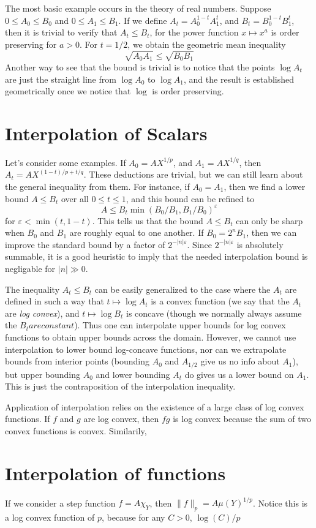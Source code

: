 The most basic example occurs in the theory of real numbers. Suppose $0 \leq A_0 \leq B_0$ and $0 \leq A_1 \leq B_1$. If we define $A_t = A_0^{1-t}A_1^t$, and $B_t = B_0^{1-t}B_1^t$, then it is trivial to verify that $A_t \leq B_t$, for the power function $x \mapsto x^a$ is order preserving for $a > 0$. For $t = 1/2$, we obtain the geometric mean inequality
%
\[ \sqrt{A_0 A_1} \leq \sqrt{B_0 B_1} \]
%
Another way to see that the bound is trivial is to notice that the points $\log A_t$ are just the straight line from $\log A_0$ to $\log A_1$, and the result is established geometrically once we notice that $\log$ is order preserving.

\section{Interpolation of Scalars}

Let's consider some examples. If $A_0 = AX^{1/p}$, and $A_1 = AX^{1/q}$, then $A_t = AX^{(1-t)/p + t/q}$. These deductions are trivial, but we can still learn about the general inequality from them. For instance, if $A_0 = A_1$, then we find a lower bound $A \leq B_t$ over all $0 \leq t \leq 1$, and this bound can be refined to
%
\[ A \leq B_t \min(B_0/B_1,B_1/B_0)^\varepsilon \]
%
for $\varepsilon < \min(t, 1-t)$. This tells us that the bound $A \leq B_t$ can only be sharp when $B_0$ and $B_1$ are roughly equal to one another. If $B_0 = 2^n B_1$, then we can improve the standard bound by a factor of $2^{-|n| \varepsilon}$. Since $2^{-|n| \varepsilon}$ is absolutely summable, it is a good heuristic to imply that the needed interpolation bound is negligable for $|n| \gg 0$.

The inequality $A_t \leq B_t$ can be easily generalized to the case where the $A_t$ are defined in such a way that $t \mapsto \log A_t$ is a convex function (we say that the $A_t$ are {\it log convex}), and $t \mapsto \log B_t$ is concave (though we normally always assume the $B_t are constant$). Thus one can interpolate upper bounds for log convex functions to obtain upper bounds across the domain. However, we cannot use interpolation to lower bound log-concave functions, nor can we extrapolate bounds from interior points (bounding $A_0$ and $A_{1/2}$ give us no info about $A_1$), but upper bounding $A_0$ and lower bounding $A_t$ do gives us a lower bound on $A_1$. This is just the contraposition of the interpolation inequality.

Application of interpolation relies on the existence of a large class of log convex functions. If $f$ and $g$ are log convex, then $fg$ is log convex because the sum of two convex functions is convex. Similarily, 

\section{Interpolation of functions}

If we consider a step function $f = A \chi_Y$, then $\| f \|_p = A \mu(Y)^{1/p}$. Notice this is a log convex function of $p$, because for any $C > 0$, $\log(C)/p$


